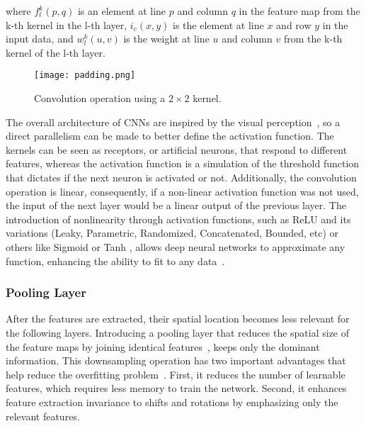 \documentclass[class=report, crop=false, a4paper, 12pt]{standalone}
\begin{document}
\noindent where $f_l^k(p, q)$ is an element at line $p$ and column $q$ in the feature map from the k-th kernel in the l-th layer, $i_c(x, y)$ is the element at line $x$ and row $y$ in the input data, and $w^k_l(u,v)$ is the weight at line $u$ and column $v$ from the k-th kernel of the l-th layer.

\begin{figure}[H]
    \centering
    \texttt{[image: padding.png]} %
    \caption{Convolution operation using a $2\times2$ kernel.}
    \label{fig:padding}
\end{figure}

\par The overall architecture of CNNs are inspired by the visual perception~\autocite{hubelReceptiveFieldsBinocular1962}, so a direct parallelism can be made to better define the activation function. The kernels can be seen as receptors, or artificial neurons, that respond to different features, whereas the activation function is a simulation of the threshold function that dictates if the next neuron is activated or not. Additionally, the convolution operation is linear, consequently, if a non-linear activation function was not used, the input of the next layer would be a linear output of the previous layer. The introduction of nonlinearity through activation functions, such as \gls{ReLU} and its variations (Leaky, Parametric, Randomized, Concatenated, Bounded, etc) or others like Sigmoid or Tanh \autocite{dubeyActivationFunctionsDeep2022}, allows deep neural networks to approximate any function, enhancing the ability to fit to any data~\autocite{liSurveyConvolutionalNeural2022}.

\subsubsection{Pooling Layer}
After the features are extracted, their spatial location becomes less relevant for the following layers. Introducing a pooling layer that reduces the spatial size of the feature maps by joining identical features~\autocite{lecunDeepLearning2015, guRecentAdvancesConvolutional2018}, keeps only the dominant information. This downsampling operation has two important advantages that help reduce the overfitting problem~\autocite{ajitReviewConvolutionalNeural2020,liSurveyConvolutionalNeural2022}. First, it reduces the number of learnable features, which requires less memory to train the network. Second, it enhances feature extraction invariance to shifts and rotations by emphasizing only the relevant features.
\end{document}
